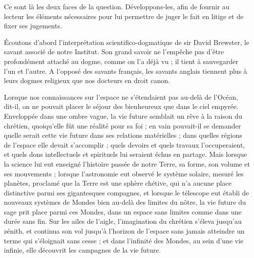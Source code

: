 \documentclass[a4paper, 11pt, oneside]{article}
\begin{document}
Ce sont là les deux faces de la question. Développons-les, afin de fournir au lecteur les éléments nécessaires pour lui permettre de juger le fait en litige et de fixer ses jugements.

Écoutons d'abord l'interprétation scientifico-dogmatique de sir David Brewster, le savant associé de notre Institut. Son grand savoir ne l'empêche pas d'être profondément attaché au dogme, comme on l'a déjà vu ; il tient à sauvegarder l'un et l'autre. A l'opposé des savants français, les savants anglais tiennent plus à leurs dogmes religieux que nos docteurs en droit canon.

Lorsque nos connaissances sur l'espace ne s'étendaient pas au-delà de l'Océan, dit-il, on ne pouvait placer le séjour des bienheureux que dans le ciel empyrée. Enveloppée dans une ombre vague, la vie future semblait un rêve à la raison du chrétien, quoiqu'elle fût une réalité pour sa foi ; en vain pouvait-il se demander quelle serait cette vie future dans ses relations matérielles ; dans quelles régions de l'espace elle devait s'accomplir ; quels devoirs et quels travaux l'occuperaient, et quels dons intellectuels et spirituels lui seraient échus en partage. Mais lorsque la science lui eut enseigné l'histoire passée de notre Terre, sa forme, son volume et ses mouvements ; lorsque l'astronomie eut observé le système solaire, mesuré les planètes, proclamé que la Terre est une sphère chétive, qui n'a aucune place distinctive parmi ses gigantesques compagnes, et lorsque le télescope eut établi de nouveaux systèmes de Mondes bien au-delà des limites du nôtre, la vie future du sage prit place parmi ces Mondes, dans un espace sans limites comme dans une durée sans fin. Sur les ailes de l'aigle, l'imagination du chrétien s'éleva jusqu'au zénith, et continua son vol jusqu'à l'horizon de l'espace sans jamais atteindre un terme qui s'éloignait sans cesse ; et dans l'infinité des Mondes, au sein d'une vie infinie, elle découvrit les campagnes de la vie future.
\end{document}
